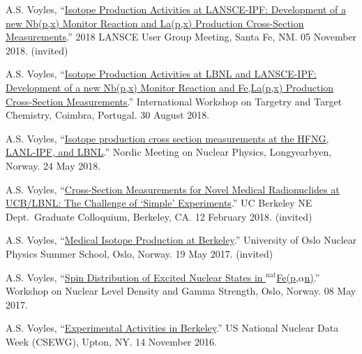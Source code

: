 \begin{bibsection}
\item A.S. Voyles, \enquote{\href{https://lansce.lanl.gov/lug2018.php}{Isotope Production Activities at LANSCE-IPF: Development of a new Nb(p,x) Monitor Reaction and La(p,x) Production Cross-Section Measurements}.} 2018 LANSCE User Group Meeting, Santa Fe, NM. 05 November 2018. (invited)

\item A.S. Voyles, \enquote{\href{https://slideslive.com/38910297/isotope-production-activities-at-lbnl-and-lansceipf-development-of-a-new-nbpx90mo-monitor-reaction-and-felapx-production-crosssection-measurements}{Isotope Production Activities at LBNL and LANSCE-IPF: Development of a new Nb(p,x) Monitor Reaction and Fe,La(p,x) Production Cross-Section Measurements}.}  International Workshop on Targetry and Target Chemistry, Coimbra, Portugal. 30 August 2018.


\item A.S. Voyles, \enquote{\href{https://indico.cern.ch/event/686407/contributions/2943775/}{Isotope production cross section measurements at the HFNG, LANL-IPF, and LBNL}.}    Nordic Meeting on Nuclear Physics, Longyearbyen, Norway. 24 May 2018.

\item A.S. Voyles, \enquote{\href{https://github.com/avoyles/presentations/blob/master/2018-02-12-UCBNE_colloquium/Voyles_12_Feb_2018_NE_Colloquium_Talk.pdf}{Cross-Section Measurements for Novel Medical Radionuclides at UCB/LBNL: The Challenge of \enquote{Simple} Experiments}.} UC Berkeley NE Dept.\ Graduate Colloquium, Berkeley, CA. 12 February 2018. (invited)

\item A.S. Voyles, \enquote{\href{https://github.com/avoyles/presentations/blob/master/2017-05-19-oslo_summer_school/Voyles_19_May_2017_Oslo_Summer_School.pdf}{Medical Isotope Production at Berkeley}.} University of Oslo Nuclear Physics Summer School, Oslo, Norway.  19 May 2017. (invited)

\item A.S. Voyles, \enquote{\href{http://tid.uio.no/workshop2017/talks/OsloWS17_Voyles.pdf}{Spin Distribution of Excited Nuclear States in $^{\text{nat}}$Fe(p,$\alpha$n)}.}  Workshop on Nuclear Level Density and Gamma Strength, Oslo, Norway. 08 May 2017.


\item A.S. Voyles, \enquote{\href{https://indico.bnl.gov/event/1743/contributions/3189/}{Experimental Activities in Berkeley}.} US National Nuclear Data Week  (CSEWG), Upton, NY. 14 November 2016.



\end{bibsection}

